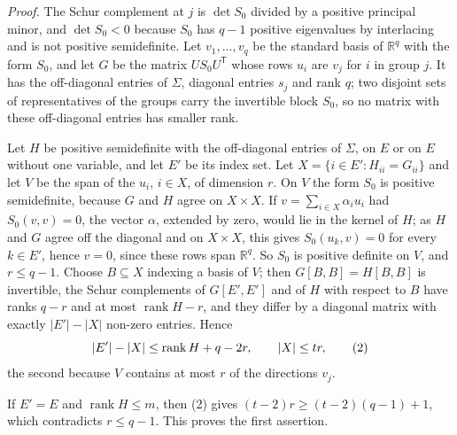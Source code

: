 \documentclass[11pt,letterpaper,reqno]{amsart}
\theoremstyle{spaced}
\begin{document}
\emph{Proof.} The Schur complement at \(j\) is \(\det S_0\) divided by a positive principal minor, and \(\det S_0 < 0\) because \(S_0\) has \(q-1\) positive eigenvalues by interlacing and is not positive semidefinite. Let \(v_1, \dots, v_q\) be the standard basis of \(\mathbb{R}^q\) with the form \(S_0\), and let \(G\) be the matrix \(U S_0 U^{\mathsf T}\) whose rows \(u_i\) are \(v_j\) for \(i\) in group \(j\). It has the off-diagonal entries of \(\Sigma\), diagonal entries \(s_j\) and rank \(q\); two disjoint sets of representatives of the groups carry the invertible block \(S_0\), so no matrix with these off-diagonal entries has smaller rank.

\begingroup{} Let \(H\) be positive semidefinite with the off-diagonal entries of \(\Sigma\), on \(E\) or on \(E\) without one variable, and let \(E'\) be its index set. Let \(X = \{i \in E' : H_{ii} = G_{ii}\}\) and let \(V\) be the span of the \(u_i\), \(i \in X\), of dimension \(r\). On \(V\) the form \(S_0\) is positive semidefinite, because \(G\) and \(H\) agree on \(X \times X\). If \(v = \sum_{i \in X} \alpha_i u_i\) had \(S_0(v, v) = 0\), the vector \(\alpha\), extended by zero, would lie in the kernel of \(H\); as \(H\) and \(G\) agree off the diagonal and on \(X \times X\), this gives \(S_0(u_k, v) = 0\) for every \(k \in E'\), hence \(v = 0\), since these rows span \(\mathbb{R}^q\). So \(S_0\) is positive definite on \(V\), and \(r \le q-1\). Choose \(B \subseteq X\) indexing a basis of \(V\); then \(G[B, B] = H[B, B]\) is invertible, the Schur complements of \(G[E', E']\) and of \(H\) with respect to \(B\) have ranks \(q - r\) and at most \(\operatorname{rank} H - r\), and they differ by a diagonal matrix with exactly \(\lvert E'\rvert - \lvert X\rvert\) non-zero entries. Hence
\[\lvert E'\rvert - \lvert X\rvert \le \operatorname{rank} H + q - 2r, \qquad \lvert X\rvert \le tr, \tag{2}\postdisplaypenalty=10000 \]
the second because \(V\) contains at most \(r\) of the directions \(v_j\).\par\endgroup

If \(E' = E\) and \(\operatorname{rank} H \le m\), then (2) gives \((t-2) r \ge (t-2)(q-1) + 1\), which contradicts \(r \le q-1\). This proves the first assertion.
\end{document}
